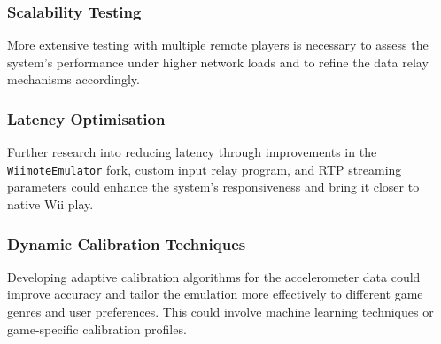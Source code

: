 \subsubsection{Scalability Testing}
More extensive testing with multiple remote players is necessary to assess the system’s performance under higher network loads and to refine the data relay mechanisms accordingly.

\subsubsection{Latency Optimisation}
Further research into reducing latency through improvements in the \texttt{WiimoteEmulator} fork, custom input relay program, and RTP streaming parameters could enhance the system’s responsiveness and bring it closer to native Wii play.

\subsubsection{Dynamic Calibration Techniques}
Developing adaptive calibration algorithms for the accelerometer data could improve accuracy and tailor the emulation more effectively to different game genres and user preferences. This could involve machine learning techniques or game-specific calibration profiles.
